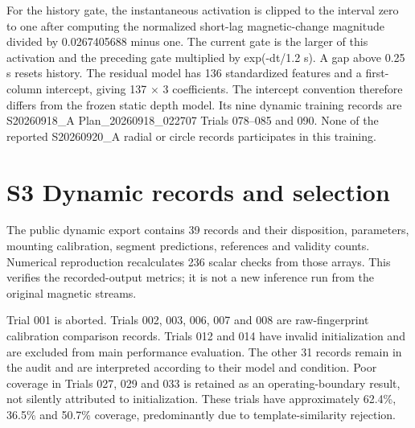 \documentclass[preprint,12pt]{elsarticle}
\begin{document}
For the history gate, the instantaneous activation is clipped to the interval zero to one after computing the normalized short-lag magnetic-change magnitude divided by 0.0267405688 minus one. The current gate is the larger of this activation and the preceding gate multiplied by exp(-dt/1.2 s). A gap above 0.25 s resets history. The residual model has 136 standardized features and a first-column intercept, giving 137 \ensuremath{\times} 3 coefficients. The intercept convention therefore differs from the frozen static depth model. Its nine dynamic training records are S20260918\_A Plan\_20260918\_022707 Trials 078--085 and 090. None of the reported S20260920\_A radial or circle records participates in this training.

\section{S3 Dynamic records and selection}

The public dynamic export contains 39 records and their disposition, parameters, mounting calibration, segment predictions, references and validity counts. Numerical reproduction recalculates 236 scalar checks from those arrays. This verifies the recorded-output metrics; it is not a new inference run from the original magnetic streams.

Trial 001 is aborted. Trials 002, 003, 006, 007 and 008 are raw-fingerprint calibration comparison records. Trials 012 and 014 have invalid initialization and are excluded from main performance evaluation. The other 31 records remain in the audit and are interpreted according to their model and condition. Poor coverage in Trials 027, 029 and 033 is retained as an operating-boundary result, not silently attributed to initialization. These trials have approximately 62.4\%, 36.5\% and 50.7\% coverage, predominantly due to template-similarity rejection.
\end{document}
